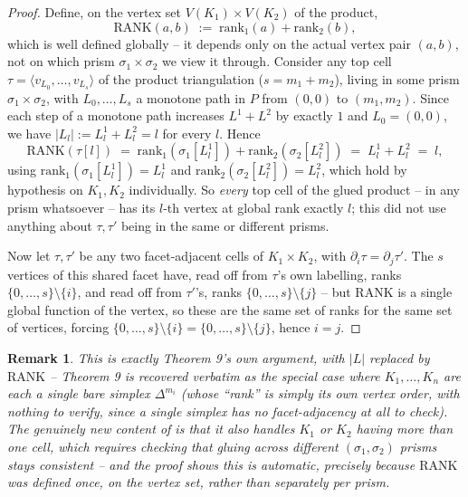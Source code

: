 \documentclass[11pt]{article}
\newtheorem*{remthm}{Remark}
\begin{document}
\begin{proof}
Define, on the vertex set $V(K_1)\times V(K_2)$ of the product,
\[
  \mathrm{RANK}(a,b) \;:=\; \mathrm{rank}_1(a) + \mathrm{rank}_2(b),
\]
which is well defined globally -- it depends only on the actual vertex
pair $(a,b)$, not on which prism $\sigma_1\times\sigma_2$ we view it
through. Consider any top cell $\tau=\langle v_{L_0},\dots,v_{L_s}\rangle$
of the product triangulation ($s=m_1+m_2$), living in some prism
$\sigma_1\times\sigma_2$, with $L_0,\dots,L_s$ a monotone path in $P$ from
$(0,0)$ to $(m_1,m_2)$. Since each step of a monotone path increases
$L^1+L^2$ by exactly $1$ and $L_0=(0,0)$, we have $|L_l|:=L^1_l+L^2_l=l$
for every $l$. Hence
\[
  \mathrm{RANK}(\tau[l]) \;=\; \mathrm{rank}_1(\sigma_1[L^1_l]) +
  \mathrm{rank}_2(\sigma_2[L^2_l]) \;=\; L^1_l + L^2_l \;=\; l ,
\]
using $\mathrm{rank}_1(\sigma_1[L^1_l])=L^1_l$ and
$\mathrm{rank}_2(\sigma_2[L^2_l])=L^2_l$, which hold by hypothesis on
$K_1,K_2$ individually. So \emph{every} top cell of the glued product --
in any prism whatsoever -- has its $l$-th vertex at global rank exactly
$l$; this did not use anything about $\tau,\tau'$ being in the same or
different prisms.

Now let $\tau,\tau'$ be any two facet-adjacent cells of $K_1\times K_2$,
with $\partial_i\tau=\partial_j\tau'$. The $s$ vertices of this shared
facet have, read off from $\tau$'s own labelling, ranks
$\{0,\dots,s\}\setminus\{i\}$, and read off from $\tau'$'s, ranks
$\{0,\dots,s\}\setminus\{j\}$ -- but $\mathrm{RANK}$ is a single global
function of the vertex, so these are the same set of ranks for the same
set of vertices, forcing $\{0,\dots,s\}\setminus\{i\}=\{0,\dots,s\}
\setminus\{j\}$, hence $i=j$.
\end{proof}

\begin{remthm}
This is exactly Theorem 9's own argument, with $|L|$ replaced by
$\mathrm{RANK}$ -- Theorem 9 is recovered verbatim as the special case
where $K_1,\dots,K_n$ are each a single bare simplex $\Delta^{m_i}$ (whose
``rank'' is simply its own vertex order, with nothing to verify, since a
single simplex has no facet-adjacency at all to check). The genuinely new
content of  is that it also handles $K_1$ or $K_2$
having \emph{more than one cell}, which requires checking that gluing
across different $(\sigma_1,\sigma_2)$ prisms stays consistent -- and the
proof shows this is automatic, precisely because $\mathrm{RANK}$ was
defined once, on the vertex set, rather than separately per prism.
\end{remthm}
\end{document}

